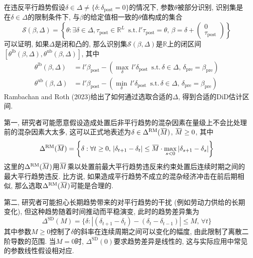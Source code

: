 \documentclass[cn,sakura,14pt,screen,bibstyle=gb7714-2015,math=mtpro2]{elegantnote}
\newcommand{\overbar}[1]{\mkern 1.5mu\overline{\mkern-1.5mu#1\mkern-1.5mu}\mkern 1.5mu}
\begin{document}
在违反平行趋势假设$\delta\in\Delta\ne\{\delta:\delta_\text{post}=0\}$的情况下, 参数$\theta$被部分识别, 识别集是在$\delta\in\Delta$的限制条件下, 与$\beta$的给定值相一致的$\theta$值构成的集合
$$\mathcal{S}(\beta,\Delta)=\left\{\theta:\exists\delta\in\Delta,\tau_\text{post}\in\mathbb{R}^L\,\,\,\mathrm{s.t.}\,l'\tau_\text{post}=\theta,\,\beta=\delta+\begin{pmatrix}                                                                                                                             0 \\
                                                                                                                                                          \tau_\text{post}
                                                                                                                                                        \end{pmatrix}\right\}$$
可以证明, 如果$\Delta$是闭和凸的, 那么识别集$\mathcal{S}(\beta,\Delta)$是$\mathbb{R}$上的闭区间$[\theta^{\text{lb}}(\beta,\Delta),\theta^{\text{ub}}(\beta,\Delta)]$, 其中
\begin{align*}
\theta^{\text{lb}}(\beta,\Delta)&=l'\beta_\text{post}-\left(\max_\delta\, l'\delta_\text{post}\,\,\,\mathrm{s.t.}\,\delta\in\Delta,\,\delta_\text{pre}=\beta_\text{pre}\right) \\
\theta^{\text{ub}}(\beta,\Delta)&=l'\beta_\text{post}-\left(\min_\delta\, l'\delta_\text{post}\,\,\,\mathrm{s.t.}\,\delta\in\Delta,\,\delta_\text{pre}=\beta_\text{pre}\right)
\end{align*}
Rambachan and Roth (2023)给出了如何通过选取合适的$\Delta$, 得到合适的DiD估计区间.

第一, 研究者可能愿意假设造成处置后非平行趋势的混杂因素在量级上不会比处理前的混杂因素大太多, 这可以正式地表述为$\delta\in\Delta^\text{RM}(\overbar{M})$, $\overbar{M}\ge0$, 其中
$$\Delta^\text{RM}(\overbar{M})=\left\{\delta:\forall t\ge0,\,|\delta_{t+1}-\delta_t|\leq \overbar{M}\cdot \max_{s<0}|\delta_{s+1}-\delta_s|\right\}$$
这里的$\Delta^\text{RM}(\overbar{M})$用$\overbar{M}$乘以处置前最大平行趋势违反来约束处置后连续时期之间的最大平行趋势违反. 比方说, 如果造成平行趋势不成立的混杂经济冲击在前后期相似, 那么选取$\Delta^\text{RM}(\overbar{M})$可能是合理的.

第二, 研究者可能担心长期趋势带来的对平行趋势的干扰 (例如劳动力供给的长期变化), 但这种趋势随着时间推动而平稳演变, 此时的趋势差异集为
$$\Delta^\text{SD}(M)=\{\delta:|(\delta_{t+1}-\delta_t)-(\delta_{t}-\delta_{t-1})|\leq M,\,\forall t\}$$
其中参数$M\ge0$控制了$\delta$的斜率在连续周期之间可以变化的幅度, 由此限制了离散二阶导数的范围. 当$M=0$时, $\Delta^\text{SD}(0)$要求趋势差异是线性的, 这与实际应用中常见的参数线性假设相对应.
\end{document}
